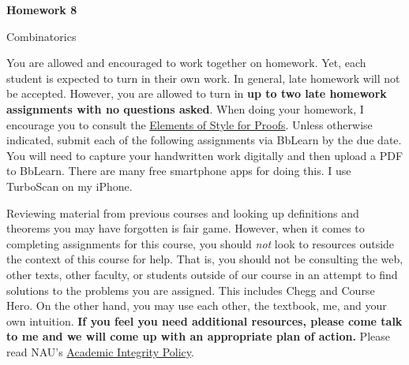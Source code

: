 \documentclass[11pt]{article}%
\theoremstyle{definition}
\newcommand{\blankline}{\pagebreak[2]\vspace{.5\baselineskip}}
\begin{document}
\begin{center}
{\Large\bf Homework 8}

\smallskip

Combinatorics
\end{center}

\thispagestyle{fancy}

You are allowed and encouraged to work together on homework. Yet, each student is expected to turn in their own work. In general, late homework will not be accepted. However, you are allowed to turn in \textbf{up to two late homework assignments with no questions asked}. When doing your homework, I encourage you to consult the \href{http://danaernst.com/teaching/ElementsOfStyle.pdf}{Elements of Style for Proofs}. Unless otherwise indicated, submit each of the following assignments via BbLearn by the due date. You will need to capture your handwritten work digitally and then upload a PDF to BbLearn. There are many free smartphone apps for doing this. I use TurboScan on my iPhone.

\blankline

Reviewing material from previous courses and looking up definitions and theorems you may have forgotten is fair game. However, when it comes to completing assignments for this course, you should \emph{not} look to resources outside the context of this course for help.  That is, you should not be consulting the web, other texts, other faculty, or students outside of our course in an attempt to find solutions to the problems you are assigned.  This includes Chegg and Course Hero. On the other hand, you may use each other, the textbook, me, and your own intuition. \textbf{If you feel you need additional resources, please come talk to me and we will come up with an appropriate plan of action.} Please read NAU's \href{https://www5.nau.edu/policies/Client/Details/828?whoIsLooking=Students&pertainsTo=All&sortDirection=Ascending&page=1}{Academic Integrity Policy}.

\blankline
\end{document}
